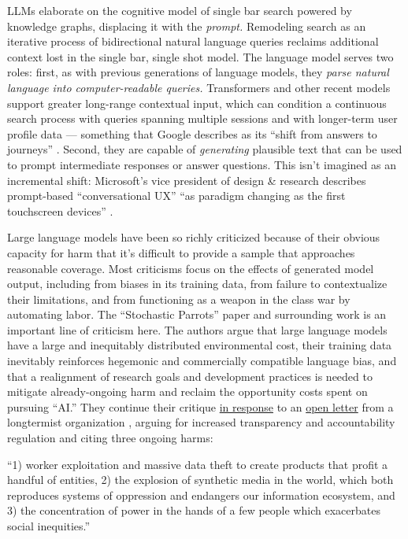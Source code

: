 LLMs elaborate on the cognitive model of single bar search powered by
knowledge graphs, displacing it with the \emph{prompt.} Remodeling
search as an iterative process of bidirectional natural language queries
reclaims additional context lost in the single bar, single shot model.
The language model serves two roles: first, as with previous generations
of language models, they \emph{parse natural language into
computer-readable queries.} Transformers and other recent models support
greater long-range contextual input, which can condition a continuous
search process with queries spanning multiple sessions \cite{maChallengesSupportingExploratory2020a}  and with longer-term user
profile data --- something that Google describes as its ``shift from
answers to journeys'' \cite{gomesImprovingSearchNext2018, konzelmannChattingYourGoogle2018} . Second, they are capable of
\emph{generating} plausible text that can be used to prompt intermediate
responses or answer questions. This isn't imagined as an incremental
shift: Microsoft's vice president of design \& research describes
prompt-based ``conversational UX'' ``as paradigm changing as the first
touchscreen devices'' \cite{friedmanBehindtheDesignMeetCopilot2023} .

Large language models have been so richly criticized because of their
obvious capacity for harm that it's difficult to provide a sample that
approaches reasonable coverage. Most criticisms focus on the effects of
generated model output, including from biases in its training data, from
failure to contextualize their limitations, and from functioning as a
weapon in the class war by automating labor. The ``Stochastic Parrots''
paper \cite{benderDangersStochasticParrots2021}  and surrounding
work is an important line of criticism here. The authors argue that
large language models have a large and inequitably distributed
environmental cost, their training data inevitably reinforces hegemonic
and commercially compatible language bias, and that a realignment of
research goals and development practices is needed to mitigate
already-ongoing harm and reclaim the opportunity costs spent on pursuing
``AI.'' They continue their critique
\href{https://www.dair-institute.org/blog/letter-statement-March2023}{in
response} to an
\href{https://futureoflife.org/open-letter/pause-giant-ai-experiments/}{open
letter} from a longtermist organization \cite{futureoflifeinstitutePauseGiantAI2023} , arguing for increased
transparency and accountability regulation and citing three ongoing
harms:

\begin{leftbar}
``1) worker exploitation and massive data theft to create products that
profit a handful of entities, 2) the explosion of synthetic media in the
world, which both reproduces systems of oppression and endangers our
information ecosystem, and 3) the concentration of power in the hands of
a few people which exacerbates social inequities.'' \cite{gebruStatementListedAuthors2023} 
\end{leftbar}

